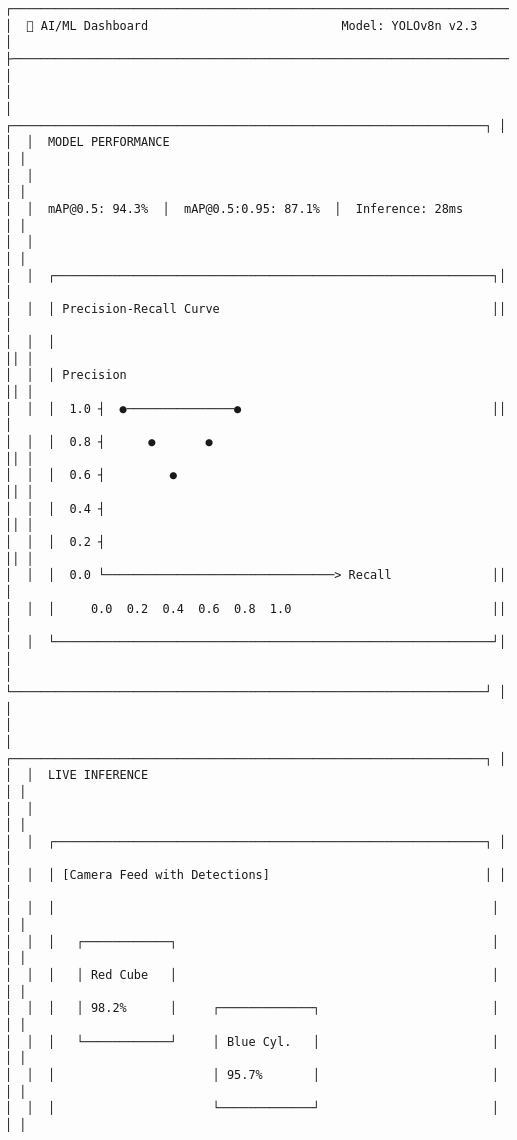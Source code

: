 \documentclass[
]{article}
\begin{document}
\begin{verbatim}
┌────────────────────────────────────────────────────────────────────────┐
│  🧠 AI/ML Dashboard                           Model: YOLOv8n v2.3      │
├────────────────────────────────────────────────────────────────────────┤
│                                                                        │
│  ┌──────────────────────────────────────────────────────────────────┐ │
│  │  MODEL PERFORMANCE                                                │ │
│  │                                                                   │ │
│  │  mAP@0.5: 94.3%  │  mAP@0.5:0.95: 87.1%  │  Inference: 28ms      │ │
│  │                                                                   │ │
│  │  ┌─────────────────────────────────────────────────────────────┐│ │
│  │  │ Precision-Recall Curve                                      ││ │
│  │  │                                                              ││ │
│  │  │ Precision                                                    ││ │
│  │  │  1.0 ┤  ●───────────────●                                   ││ │
│  │  │  0.8 ┤      ●       ●                                        ││ │
│  │  │  0.6 ┤         ●                                             ││ │
│  │  │  0.4 ┤                                                       ││ │
│  │  │  0.2 ┤                                                       ││ │
│  │  │  0.0 └────────────────────────────────> Recall              ││ │
│  │  │     0.0  0.2  0.4  0.6  0.8  1.0                            ││ │
│  │  └─────────────────────────────────────────────────────────────┘│ │
│  └──────────────────────────────────────────────────────────────────┘ │
│                                                                        │
│  ┌──────────────────────────────────────────────────────────────────┐ │
│  │  LIVE INFERENCE                                                  │ │
│  │                                                                   │ │
│  │  ┌────────────────────────────────────────────────────────────┐ │ │
│  │  │ [Camera Feed with Detections]                              │ │ │
│  │  │                                                             │ │ │
│  │  │   ┌────────────┐                                            │ │ │
│  │  │   │ Red Cube   │                                            │ │ │
│  │  │   │ 98.2%      │     ┌─────────────┐                        │ │ │
│  │  │   └────────────┘     │ Blue Cyl.   │                        │ │ │
│  │  │                      │ 95.7%       │                        │ │ │
│  │  │                      └─────────────┘                        │ │ │

\end{verbatim}
\end{document}
